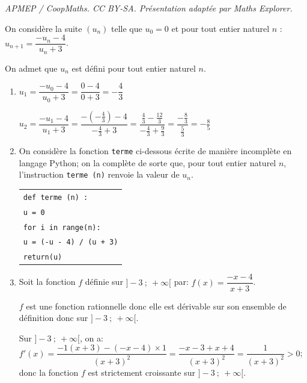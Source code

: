 \documentclass[10pt]{article}
\providecommand{\blue}{\color{blue}}
\providecommand{\blue}{\color{blue}}
\begin{document}
\noindent\textit{APMEP / CoopMaths. CC BY-SA. Présentation adaptée par Maths Explorer.}\par\medskip
\medskip

On considère la suite $\left(u_n\right)$ telle que $u_0 = 0$ et pour tout entier naturel $n$  : 
$u_{n+1} = \dfrac{-u_n - 4}{u_n + 3}$.

On admet que $u_n$ est défini pour tout entier naturel $n$.



\begin{enumerate}
\item 
$u_1=\dfrac{-u_0-4}{u_0+3} = \dfrac{0-4}{0+3}=-\dfrac{4}{3}$

$u_2=\dfrac{-u_1-4}{u_1+3} =\dfrac{-\left (-\frac{4}{3}\right )-4}{-\frac{4}{3}+3} 
= \dfrac{\frac{4}{3} - \frac{12}{3}}{-\frac{4}{3}+\frac{9}{3}}
= \dfrac{-\frac{8}{3}}{\frac{5}{3}}
= -\frac{8}{5}$

\item On considère la fonction \texttt{terme} ci-dessous écrite de manière incomplète en langage Python; on la complète de sorte que, pour tout entier naturel $n$, l'instruction \texttt{terme (n)} renvoie la valeur de $u_n$.

\begin{center}
\begin{tabular}{|l|}\hline
\texttt{def terme (n) :}\\
\hspace{0.75cm}\texttt{u = \blue 0}\\
\hspace{0.75cm}\texttt{for i in range(n):}\\
\hspace{1.25cm}\texttt{u = \blue (-u - 4) / (u + 3)}\\
\hspace{0.75cm}\texttt{return(u)}\\ \hline
\end{tabular}
\end{center}


\item Soit la fonction $f$ définie sur $]- 3~;~+\infty[$ par: $f(x) = \dfrac{- x - 4}{x+ 3}$.



$f$ est une fonction rationnelle donc elle est dérivable sur son ensemble de définition donc sur $]- 3~;~+\infty[$.

Sur $]- 3~;~+\infty[$, on a:
$f'(x)=\dfrac{-1(x+3)-(-x-4)\times 1}{(x+3)^2}
= \dfrac{-x-3+x+4}{(x+3)^2}
=\dfrac{1}{(x+3)^2}>0$;
donc  la fonction $f$ est strictement croissante sur $]- 3~;~+\infty[$.


\end{enumerate}
\end{document}
